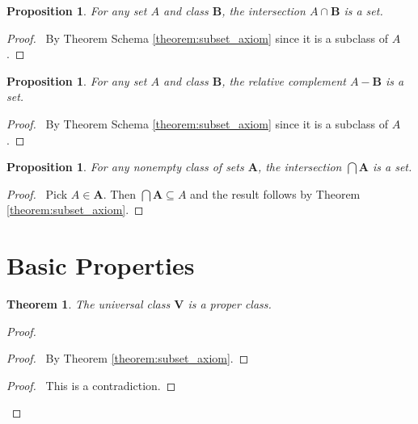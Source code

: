 \documentclass{report}
\let\qed\relax
\newtheorem{proposition}[axiom]{Proposition}
\newtheorem{theorem}[axiom]{Theorem}
\theoremstyle{definition}
\begin{document}
    \begin{proposition}
        For any set $A$ and class $\mathbf{B}$, the intersection $A \cap \mathbf{B}$ is a set.
    \end{proposition}

    \begin{proof}
        \pf\ By Theorem Schema \ref{theorem:subset_axiom} since it is a subclass of $A$. \qed
    \end{proof}

    \begin{proposition}
        For any set $A$ and class $\mathbf{B}$, the relative complement $A - \mathbf{B}$ is a set.
    \end{proposition}

    \begin{proof}
        \pf\ By Theorem Schema \ref{theorem:subset_axiom} since it is a subclass of $A$. \qed
    \end{proof}
    
    \begin{proposition}
        For any nonempty class of sets $\mathbf{A}$, the intersection $\bigcap \mathbf{A}$ is a set.
    \end{proposition}

    \begin{proof}
        \pf\ Pick $A \in \mathbf{A}$. Then $\bigcap \mathbf{A} \subseteq A$ and the result follows by
        Theorem \ref{theorem:subset_axiom}. \qed
    \end{proof}
    
    \section{Basic Properties}

    \begin{theorem}
        The universal class $\mathbf{V}$ is a proper class.
    \end{theorem}

    \begin{proof}
        \pf
        \begin{proof}
            \pf\ By Theorem \ref{theorem:subset_axiom}.
        \end{proof}
        \qedstep
        \begin{proof}
            \pf\ This is a contradiction.
        \end{proof}
        \qed
    \end{proof}
\end{document}
